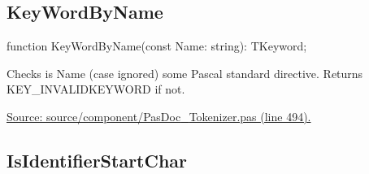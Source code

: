 \documentclass{report}
\newif\ifpdf
\begin{document}
\subsection*{KeyWordByName}
\fi
\label{PasDoc_Tokenizer-KeyWordByName}
\begin{list}{}{
\setlength{\itemindent}{0cm}
\setlength{\listparindent}{0cm}
\setlength{\leftmargin}{\evensidemargin}
\addtolength{\leftmargin}{\tmplength}
\settowidth{\labelsep}{X}
\addtolength{\leftmargin}{\labelsep}
\setlength{\labelwidth}{\tmplength}
}
\item[\textbf{Declaration}\hfill]
\ifpdf
\begin{flushleft}
\fi
\begin{ttfamily}
function KeyWordByName(const Name: string): TKeyword;\end{ttfamily}

\ifpdf
\end{flushleft}
\fi

\par
\item[\textbf{Description}]
Checks is Name (case ignored) some Pascal standard directive. Returns KEY{\_}INVALIDKEYWORD if not.\par
\href{https://github.com/pasdoc/pasdoc/blob/master/source/component/PasDoc_Tokenizer.pas#L494}{Source: source/component/PasDoc{\_}Tokenizer.pas (line 494).}

\end{list}
\ifpdf
\subsection*{\large{\textbf{IsIdentifierStartChar}}\normalsize\hspace{1ex}\hrulefill}
\else
\end{document}
